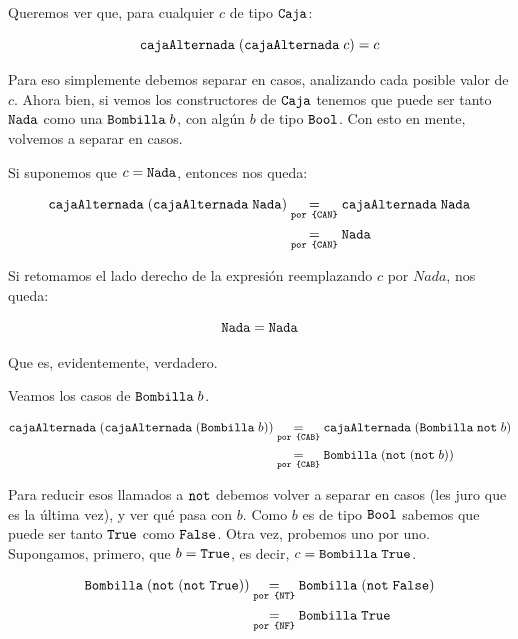 Queremos ver que, para cualquier $c$ de tipo $\caja$:

$$\cajaAlternada \; (\cajaAlternada \; c) = c$$

Para eso simplemente debemos separar en casos, analizando cada posible valor de $c$. Ahora bien, si vemos los constructores de $\caja$ tenemos que puede ser tanto $\nada$ como una $\bombilla{b}$, con algún $b$ de tipo $\bool$. Con esto en mente, volvemos a separar en casos.

Si suponemos que $c = \nada$, entonces nos queda:

\begin{equation*}
    \begin{aligned}
        \igualesPor{\cajaAlternada \; (\cajaAlternada \; \nada)}{\cajaAlternada \; \nada}{por \formula{CAN}} \\
        \igualesPor{}{\nada}{por \formula{CAN}} \\
    \end{aligned}
\end{equation*}

Si retomamos el lado derecho de la expresión reemplazando $c$ por $Nada$, nos queda:

$$\nada = \nada$$

Que es, evidentemente, verdadero.

Veamos los casos de $\bombilla{b}$.

\begin{equation*}
    \begin{aligned}
        \igualesPor{\cajaAlternada \; (\cajaAlternada \; (\bombilla{b}))}{\cajaAlternada \; (\bombilla{\notfunc \; b})}{por \formula{CAB}} \\
        \igualesPor{}{\bombilla{(\notfunc \; (\notfunc \; b))}}{por \formula{CAB}} \\
    \end{aligned}
\end{equation*}

Para reducir esos llamados a $\notfunc$ debemos volver a separar en casos (les juro que es la última vez), y ver qué pasa con $b$. Como $b$ es de tipo $\bool$ sabemos que puede ser tanto $\true$ como $\false$. Otra vez, probemos uno por uno. Supongamos, primero, que $b = \true$, es decir, $c = \bombilla{\true}$.

\begin{equation*}
    \begin{aligned}
        \igualesPor{\bombilla{(\notfunc \; (\notfunc \; \true))}}{\bombilla{(\notfunc \; \false)}}{por \formula{NT}} \\
        \igualesPor{}{\bombilla{\true}}{por \formula{NF}} \\
    \end{aligned}
\end{equation*}

